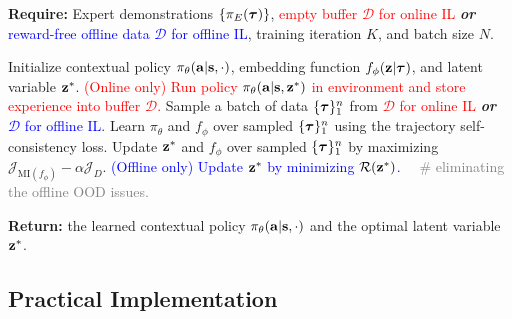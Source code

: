 \begin{algorithm}[t]
	\caption{Training CEIL:  \textcolor{red}{Online} \textbf{\textit{or}} \textcolor{blue}{Offline} IL Setting}
	\label{alg:ceil}
	\textbf{Require:} Expert demonstrations $\{\pi_E({\bm{\tau}})\}$, \textcolor{red}{empty buffer $\mathcal{D}$ for {online} IL} \textbf{\textit{or}} \textcolor{blue}{reward-free offline data $\mathcal{D}$ for {offline} IL}, training iteration $K$, and batch size $N$. 
	
	\begin{algorithmic}[1]
		\STATE Initialize contextual policy $\pi_\theta(\mathbf{a}|\mathbf{s},\cdot)$, embedding function $f_\phi({\mathbf{z}}|{\bm{\tau}})$, and latent variable ${\mathbf{z}}^*$. 
		\STATE \textcolor{red}{(Online only) Run policy $\pi_\theta(\mathbf{a}|\mathbf{s},{\mathbf{z}}^*)$ in environment and store experience into buffer $\mathcal{D}$.} %
		\STATE Sample a batch of data $\{ {\bm{\tau}} \}_1^n$ from \textcolor{red}{$\mathcal{D}$ for online IL} \textbf{\textit{or}} \textcolor{blue}{$\mathcal{D}$ for offline IL}. %
		\STATE Learn $\pi_\theta$ and $f_\phi$ over sampled $\{ {\bm{\tau}} \}_1^n$ using the trajectory self-consistency loss. 
		\STATE Update ${\mathbf{z}}^*$ and $f_\phi$ over sampled $\{ {\bm{\tau}} \}_1^n$ by maximizing $\mathcal{J}_{\text{MI}(f_\phi)} - \alpha \mathcal{J}_{D}$.
		\STATE \textcolor{blue}{(Offline only) Update ${\mathbf{z}}^*$ by minimizing  $\mathcal{R}({\mathbf{z}}^*)$.} \textcolor{gray}{\ \ \# eliminating the offline OOD issues.} %
		\ENDFOR
	\end{algorithmic}
	\textbf{Return:} the learned contextual policy $\pi_\theta(\mathbf{a}|\mathbf{s},\cdot)$ and the optimal latent variable ${\mathbf{z}}^*$.
\end{algorithm}
\subsection{Practical Implementation}
\label{sec:practical-implementation}

